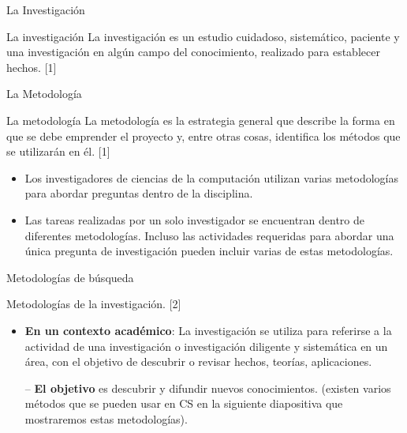 \begin{frame}{La Investigación}
\begin{block}{La investigación}
La investigación es un estudio cuidadoso, sistemático, paciente y una investigación en algún campo del conocimiento, realizado para establecer hechos. [1]
\end{block} 
\end{frame}


\begin{frame}{La Metodología}
\begin{block}{La metodología}
La metodología es la estrategia general que describe la forma en que se debe emprender el proyecto y, entre otras cosas, identifica los métodos que se utilizarán en él. [1]
\end{block} 
\begin{exampleblock}{}
\begin{itemize}
    \item Los investigadores de ciencias de la computación utilizan varias metodologías para abordar preguntas dentro de la disciplina. 
    \item Las tareas realizadas por un solo investigador se encuentran dentro de diferentes metodologías. Incluso las actividades requeridas para abordar una única pregunta de investigación pueden incluir varias de estas metodologías.
\end{itemize}
\end{exampleblock}
\end{frame}

\begin{frame}{Metodologías de búsqueda}
\begin{block}{Metodologías de la investigación. [2]}
\begin{itemize}
\item \textbf{En un contexto académico}: La investigación se utiliza para referirse a la actividad de una investigación o investigación diligente y sistemática en un área, con el objetivo de descubrir o revisar hechos, teorías, aplicaciones. 
\item [--] \textbf{El objetivo} es descubrir y difundir nuevos conocimientos. (existen varios métodos que se pueden usar en CS en la siguiente diapositiva que mostraremos estas metodologías).
\end{itemize}
\end{block} 
\end{frame}

